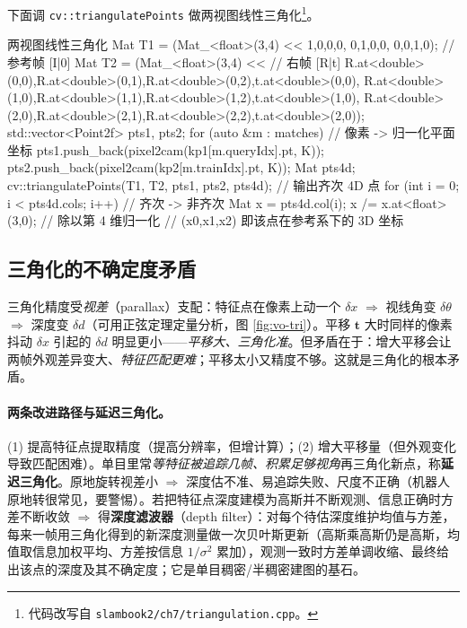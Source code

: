 \begin{practice}
下面调 \texttt{cv::triangulatePoints} 做两视图线性三角化\footnote{代码改写自 \texttt{slambook2/\allowbreak ch7/\allowbreak triangulation.\allowbreak cpp}\cite{gaoxiang2019slam14}。}。
\begin{codebox}[C++]{两视图线性三角化}
Mat T1 = (Mat_<float>(3,4) << 1,0,0,0, 0,1,0,0, 0,0,1,0);   // 参考帧 [I|0]
Mat T2 = (Mat_<float>(3,4) <<                                  // 右帧 [R|t]
  R.at<double>(0,0),R.at<double>(0,1),R.at<double>(0,2),t.at<double>(0,0),
  R.at<double>(1,0),R.at<double>(1,1),R.at<double>(1,2),t.at<double>(1,0),
  R.at<double>(2,0),R.at<double>(2,1),R.at<double>(2,2),t.at<double>(2,0));
std::vector<Point2f> pts1, pts2;
for (auto &m : matches) {                 // 像素 -> 归一化平面坐标
  pts1.push_back(pixel2cam(kp1[m.queryIdx].pt, K));
  pts2.push_back(pixel2cam(kp2[m.trainIdx].pt, K));
}
Mat pts4d;
cv::triangulatePoints(T1, T2, pts1, pts2, pts4d);   // 输出齐次 4D 点
for (int i = 0; i < pts4d.cols; i++) {              // 齐次 -> 非齐次
  Mat x = pts4d.col(i);  x /= x.at<float>(3,0);     // 除以第 4 维归一化
  // (x0,x1,x2) 即该点在参考系下的 3D 坐标
}
\end{codebox}
\end{practice}

\subsection{三角化的不确定度矛盾}
\label{sec:vo-tri-uncertainty}

\begin{insight}[视差—深度不确定度矛盾]
三角化精度受\emph{视差}（parallax）支配\cite{gaoxiang2019slam14}：特征点在像素上动一个 $\delta x$ $\Rightarrow$ 视线角变 $\delta\theta$ $\Rightarrow$ 深度变 $\delta d$（可用正弦定理定量分析，图 \ref{fig:vo-tri}）。平移 $\mathbf{t}$ 大时同样的像素抖动 $\delta x$ 引起的 $\delta d$ 明显更小——\emph{平移大、三角化准}。但矛盾在于：增大平移会让两帧外观差异变大、\emph{特征匹配更难}；平移太小又精度不够。这就是三角化的根本矛盾。
\end{insight}

\paragraph{两条改进路径与延迟三角化\cite{gaoxiang2019slam14}。}
(1) 提高特征点提取精度（提高分辨率，但增计算）；(2) 增大平移量（但外观变化导致匹配困难）。单目里常\emph{等特征被追踪几帧、积累足够视角}再三角化新点，称\textbf{延迟三角化}。原地旋转视差小 $\Rightarrow$ 深度估不准、易追踪失败、尺度不正确（机器人原地转很常见，要警惕）。若把特征点深度建模为高斯并不断观测、信息正确时方差不断收敛 $\Rightarrow$ 得\textbf{深度滤波器}（depth filter）：对每个待估深度维护均值与方差，每来一帧用三角化得到的新深度测量做一次贝叶斯更新（高斯乘高斯仍是高斯，均值取信息加权平均、方差按信息 $1/\sigma^2$ 累加），观测一致时方差单调收缩、最终给出该点的深度及其不确定度；它是单目稠密/半稠密建图的基石。

